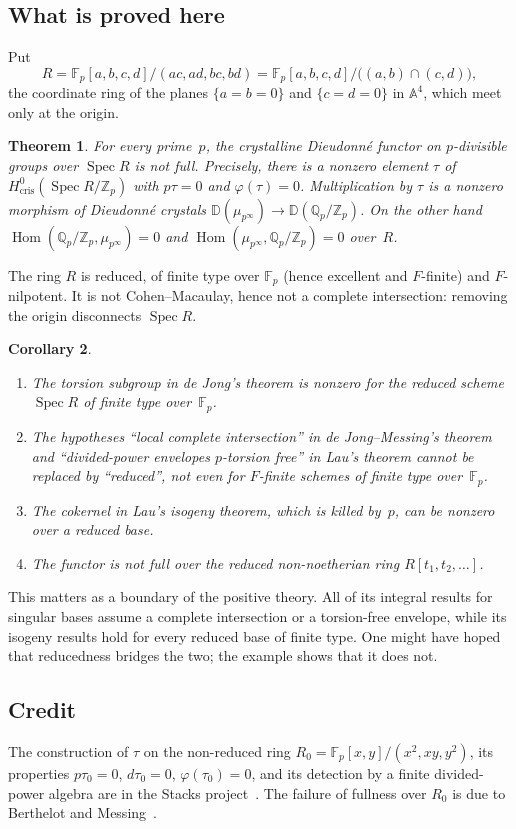 \documentclass[11pt]{amsart}
\newtheorem{theorem}{Theorem}[section]
\newtheorem{corollary}[theorem]{Corollary}
\theoremstyle{remark}
\newcommand{\Fp}{\mathbb{F}_p}
\newcommand{\Zp}{\mathbb{Z}_p}
\newcommand{\Qp}{\mathbb{Q}_p}
\newcommand{\D}{\mathbb{D}}
\newcommand{\cris}{\mathrm{cris}}
\newcommand{\Hom}{\operatorname{Hom}}
\newcommand{\Spec}{\operatorname{Spec}}
\newcommand{\mup}{\mu_{p^\infty}}
\newcommand{\QZ}{\Qp/\Zp}
\begin{document}
\subsection*{What is proved here}
Put
\[
R=\Fp[a,b,c,d]/(ac,ad,bc,bd)=\Fp[a,b,c,d]/\bigl((a,b)\cap(c,d)\bigr),
\]
the coordinate ring of the planes $\{a=b=0\}$ and $\{c=d=0\}$ in $\mathbb A^4$, which meet only at the origin.

\begin{theorem}\label{thm:main}
For every prime~$p$, the crystalline Dieudonn\'e functor on $p$-divisible groups over $\Spec R$ is not full.
Precisely, there is a nonzero element $\tau$ of $H^0_{\cris}(\Spec R/\Zp)$ with $p\tau=0$ and $\varphi(\tau)=0$.
Multiplication by $\tau$ is a nonzero morphism of Dieudonn\'e crystals $\D(\mup)\to\D(\QZ)$. On the other hand
$\Hom(\QZ,\mup)=0$ and $\Hom(\mup,\QZ)=0$ over~$R$.
\end{theorem}

The ring $R$ is reduced, of finite type over $\Fp$ (hence excellent and $F$-finite) and $F$-nilpotent. It is not
Cohen--Macaulay, hence not a complete intersection: removing the origin disconnects $\Spec R$.

\begin{corollary}\label{cor:main}
\begin{enumerate}
\item The torsion subgroup in de Jong's theorem is nonzero for the reduced scheme $\Spec R$ of finite type over~$\Fp$.
\item The hypotheses ``local complete intersection'' in de Jong--Messing's theorem and ``divided-power envelopes $p$-torsion
  free'' in Lau's theorem cannot be replaced by ``reduced'', not even for $F$-finite schemes of finite type over~$\Fp$.
\item The cokernel in Lau's isogeny theorem, which is killed by~$p$, can be nonzero over a reduced base.
\item The functor is not full over the reduced non-noetherian ring $R[t_1,t_2,\dots]$.
\end{enumerate}
\end{corollary}

This matters as a boundary of the positive theory. All of its integral results for singular bases assume a complete
intersection or a torsion-free envelope, while its isogeny results hold for every reduced base of finite type. One
might have hoped that reducedness bridges the two; the example shows that it does not.

\subsection*{Credit}
The construction of $\tau$ on the non-reduced ring $R_0=\Fp[x,y]/(x^2,xy,y^2)$, its properties $p\tau_0=0$,
$d\tau_0=0$, $\varphi(\tau_0)=0$, and its detection by a finite divided-power algebra are in the Stacks
project~\cite[Example~07LJ]{Stacks}. The failure of fullness over $R_0$ is due to Berthelot and Messing~\cite[4.4.1]{BM}.
\end{document}
